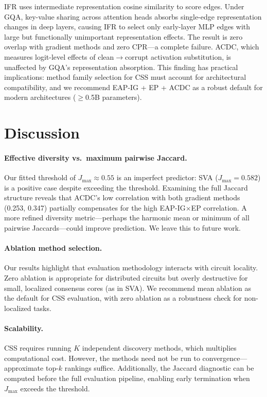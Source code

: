 \documentclass[11pt]{article}
\newcommand{\css}{\textsc{CSS}}
\begin{document}
IFR uses intermediate representation cosine similarity to score edges. Under GQA, key-value sharing across attention heads absorbs single-edge representation changes in deep layers, causing IFR to select only early-layer MLP edges with large but functionally unimportant representation effects. The result is zero overlap with gradient methods and zero CPR---a complete failure. ACDC, which measures logit-level effects of clean$\to$corrupt activation substitution, is unaffected by GQA's representation absorption. This finding has practical implications: method family selection for \css{} must account for architectural compatibility, and we recommend EAP-IG + EP + ACDC as a robust default for modern architectures ($\geq$0.5B parameters).

\section{Discussion}
\label{sec:discussion}

\paragraph{Effective diversity vs.\ maximum pairwise Jaccard.} Our fitted threshold of $J_{\max} \approx 0.55$ is an imperfect predictor: SVA ($J_{\max} = 0.582$) is a positive case despite exceeding the threshold. Examining the full Jaccard structure reveals that ACDC's low correlation with both gradient methods (0.253, 0.347) partially compensates for the high EAP-IG$\times$EP correlation. A more refined diversity metric---perhaps the harmonic mean or minimum of all pairwise Jaccards---could improve prediction. We leave this to future work.

\paragraph{Ablation method selection.} Our results highlight that evaluation methodology interacts with circuit locality. Zero ablation is appropriate for distributed circuits but overly destructive for small, localized consensus cores (as in SVA). We recommend mean ablation as the default for \css{} evaluation, with zero ablation as a robustness check for non-localized tasks.

\paragraph{Scalability.} \css{} requires running $K$ independent discovery methods, which multiplies computational cost. However, the methods need not be run to convergence---approximate top-$k$ rankings suffice. Additionally, the Jaccard diagnostic can be computed before the full evaluation pipeline, enabling early termination when $J_{\max}$ exceeds the threshold.
\end{document}
